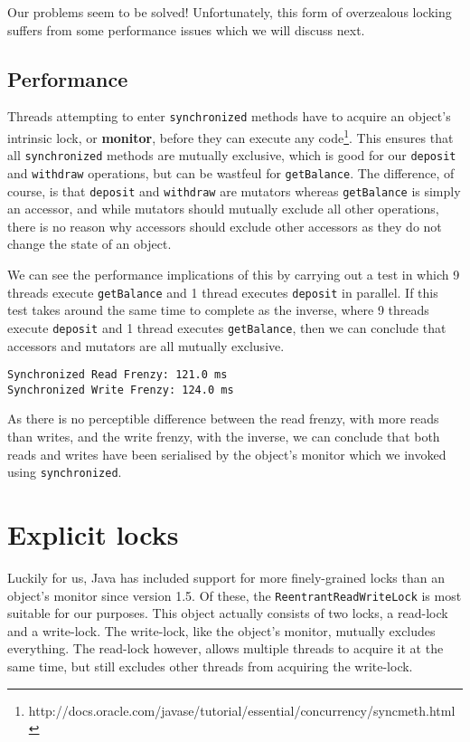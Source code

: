 \documentclass[a4paper,12pt]{kth-mag}
\begin{document}
Our problems seem to be solved! Unfortunately, this form of overzealous locking suffers from some performance issues which we will discuss next.

\subsection{Performance}

Threads attempting to enter \texttt{synchronized} methods have to acquire an object's intrinsic lock, or \textbf{monitor}, before they can execute any code\footnote{http://docs.oracle.com/javase/tutorial/essential/concurrency/syncmeth.html}. This ensures that all \texttt{synchronized} methods are mutually exclusive, which is good for our \texttt{deposit} and \texttt{withdraw} operations, but can be wastfeul for \texttt{getBalance}. The difference, of course, is that \texttt{deposit} and \texttt{withdraw} are mutators whereas \texttt{getBalance} is simply an accessor, and while mutators should mutually exclude all other operations, there is no reason why accessors should exclude other accessors as they do not change the state of an object. 

We can see the performance implications of this by carrying out a test in which 9 threads execute \texttt{getBalance} and 1 thread executes \texttt{deposit} in parallel. If this test takes around the same time to complete as the inverse, where 9 threads execute \texttt{deposit} and 1 thread executes \texttt{getBalance}, then we can conclude that accessors and mutators are all mutually exclusive.

\begin{listing}[H]
	\begin{verbatim}
Synchronized Read Frenzy: 121.0 ms
Synchronized Write Frenzy: 124.0 ms
	\end{verbatim}
\end{listing}

As there is no perceptible difference between the read frenzy, with more reads than writes, and the write frenzy, with the inverse, we can conclude that both reads and writes have been serialised by the object's monitor which we invoked using \texttt{synchronized}.

\section{Explicit locks}

Luckily for us, Java has included support for more finely-grained locks than an object's monitor since version 1.5. Of these, the \texttt{ReentrantReadWriteLock} is most suitable for our purposes. This object actually consists of two locks, a read-lock and a write-lock. The write-lock, like the object's monitor, mutually excludes everything. The read-lock however, allows multiple threads to acquire it at the same time, but still excludes other threads from acquiring the write-lock.
\end{document}
